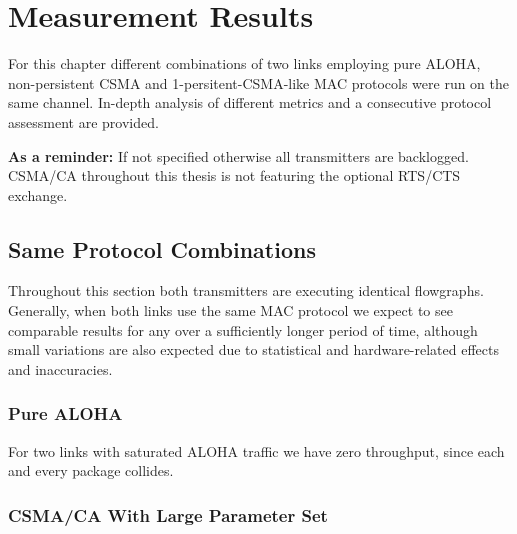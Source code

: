 \chapter{Measurement Results}

For this chapter different combinations of two links employing pure ALOHA, non-persistent CSMA and 1-persitent-CSMA-like MAC protocols were run on the same channel. In-depth analysis of different metrics and a consecutive protocol assessment are provided. 

\textbf{As a reminder:} If not specified otherwise all transmitters are backlogged. CSMA/CA throughout this thesis is not featuring the optional RTS/CTS exchange.

\section{Same Protocol Combinations}

Throughout this section both transmitters are executing identical flowgraphs. Generally, when both links use the same MAC protocol we expect to see comparable results for any over a sufficiently longer period of time, although small variations are also expected due to statistical and hardware-related effects and inaccuracies. 

\subsection{Pure ALOHA}

For two links with saturated ALOHA traffic we have zero throughput, since each and every package collides.  

\subsection{CSMA/CA With Large Parameter Set}


